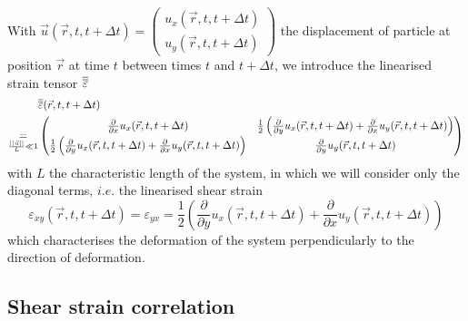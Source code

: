 \documentclass[class=report, float=false, crop=false]{standalone}
\begin{document}
With $\vec{u}(\vec{r}, t, t + \Delta t) = \begin{pmatrix} u_x(\vec{r}, t, t + \Delta t) \\ u_y(\vec{r}, t, t + \Delta t) \end{pmatrix}$ the displacement of particle at position $\vec{r}$ at time $t$ between times $t$ and $t + \Delta t$, we introduce the linearised strain tensor $\overline{\overline{\varepsilon}}$ \cite{landau1986theory}
\begin{equation}
\begin{aligned}
&\overline{\overline{\varepsilon}}(\vec{r}, t, t + \Delta t)\\
\underset{\frac{||\vec{u}||}{L} \ll 1}{=} &\begin{pmatrix} \frac{\partial}{\partial x} u_x(\vec{r}, t, t + \Delta t) & \frac{1}{2} \left(\frac{\partial}{\partial y} u_x(\vec{r}, t, t + \Delta t) + \frac{\partial}{\partial x} u_y(\vec{r}, t, t + \Delta t)\right) \\ \frac{1}{2} \left(\frac{\partial}{\partial y} u_x(\vec{r}, t, t + \Delta t) + \frac{\partial}{\partial x} u_y(\vec{r}, t, t + \Delta t)\right) &  \frac{\partial}{\partial y} u_y(\vec{r}, t, t + \Delta t) \end{pmatrix}
\end{aligned}
\end{equation}
with $L$ the characteristic length of the system, in which we will consider only the diagonal terms, $\textit{i.e.}$ the linearised shear strain
\begin{equation}
\varepsilon_{xy}(\vec{r}, t, t + \Delta t) = \varepsilon_{yx} = \frac{1}{2} \left(\frac{\partial}{\partial y} u_x(\vec{r}, t, t + \Delta t) + \frac{\partial}{\partial x} u_y(\vec{r}, t, t + \Delta t)\right)
\label{linearised_shear_strain}
\end{equation}
which characterises the deformation of the system perpendicularly to the direction of deformation.

\subsection{Shear strain correlation}
\end{document}
